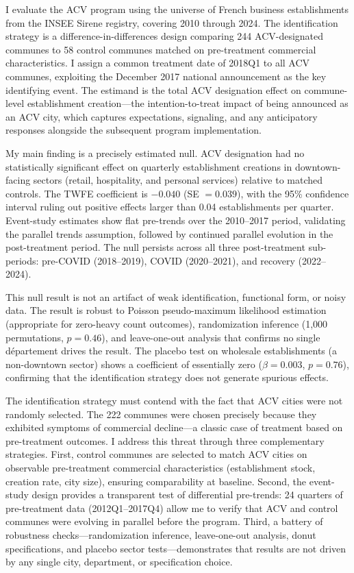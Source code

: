 \documentclass[12pt]{article}
\begin{document}
I evaluate the ACV program using the universe of French business establishments from the INSEE Sirene registry, covering 2010 through 2024. The identification strategy is a difference-in-differences design comparing 244 ACV-designated communes to 58 control communes matched on pre-treatment commercial characteristics. I assign a common treatment date of 2018Q1 to all ACV communes, exploiting the December 2017 national announcement as the key identifying event. The estimand is the total ACV designation effect on commune-level establishment creation---the intention-to-treat impact of being announced as an ACV city, which captures expectations, signaling, and any anticipatory responses alongside the subsequent program implementation.

My main finding is a precisely estimated null. ACV designation had no statistically significant effect on quarterly establishment creations in downtown-facing sectors (retail, hospitality, and personal services) relative to matched controls. The TWFE coefficient is $-0.040$ (SE $= 0.039$), with the 95\% confidence interval ruling out positive effects larger than 0.04 establishments per quarter. Event-study estimates show flat pre-trends over the 2010--2017 period, validating the parallel trends assumption, followed by continued parallel evolution in the post-treatment period. The null persists across all three post-treatment sub-periods: pre-COVID (2018--2019), COVID (2020--2021), and recovery (2022--2024).

This null result is not an artifact of weak identification, functional form, or noisy data. The result is robust to Poisson pseudo-maximum likelihood estimation (appropriate for zero-heavy count outcomes), randomization inference (1,000 permutations, $p = 0.46$), and leave-one-out analysis that confirms no single d\'epartement drives the result. The placebo test on wholesale establishments (a non-downtown sector) shows a coefficient of essentially zero ($\beta = 0.003$, $p = 0.76$), confirming that the identification strategy does not generate spurious effects.

The identification strategy must contend with the fact that ACV cities were not randomly selected. The 222 communes were chosen precisely because they exhibited symptoms of commercial decline---a classic case of treatment based on pre-treatment outcomes. I address this threat through three complementary strategies. First, control communes are selected to match ACV cities on observable pre-treatment commercial characteristics (establishment stock, creation rate, city size), ensuring comparability at baseline. Second, the event-study design provides a transparent test of differential pre-trends: 24 quarters of pre-treatment data (2012Q1--2017Q4) allow me to verify that ACV and control communes were evolving in parallel before the program. Third, a battery of robustness checks---randomization inference, leave-one-out analysis, donut specifications, and placebo sector tests---demonstrates that results are not driven by any single city, department, or specification choice.
\end{document}
